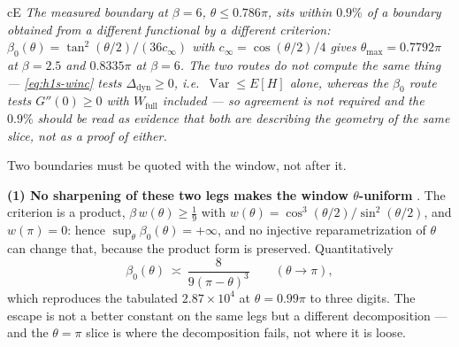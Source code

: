\begin{claimbox}{cE}
\emph{The measured boundary at $\beta=6$, $\theta\le0.786\pi$, sits within $0.9\%$ of a boundary
obtained from a different functional by a different criterion:
$\beta_{0}(\theta)=\tan^{2}(\theta/2)/(36c_{\infty})$ with $c_{\infty}=\cos(\theta/2)/4$ gives
$\theta_{\max}=0.7792\pi$ at $\beta=2.5$ and $0.8335\pi$ at $\beta=6$. The two routes do not compute
the same thing --- \eqref{eq:h1s-winc} tests $\Delta_{\mathrm{dyn}}\ge0$, i.e.\ $\operatorname{Var}\le E[H]$
alone, whereas the $\beta_{0}$ route tests $G''(0)\ge0$ with $W_{\mathrm{full}}$ included --- so
agreement is not required and the $0.9\%$ should be read as evidence that both are describing the
geometry of the same slice, not as a proof of either.} \LE{}
\end{claimbox}


Two boundaries must be quoted with the window, not after it.

\textbf{(1) No sharpening of these two legs makes the window $\theta$-uniform} \LN. The criterion is a
product, $\beta\,w(\theta)\ge\tfrac19$ with $w(\theta)=\cos^{3}(\theta/2)/\sin^{2}(\theta/2)$, and
$w(\pi)=0$: hence $\sup_{\theta}\beta_{0}(\theta)=+\infty$, and no injective reparametrization of
$\theta$ can change that, because the product form is preserved. Quantitatively
\begin{equation}
\beta_{0}(\theta)\ \asymp\ \frac{8}{9(\pi-\theta)^{3}}\qquad(\theta\to\pi),
\label{eq:h1s-div}
\end{equation}
which reproduces the tabulated $2.87\times10^{4}$ at $\theta=0.99\pi$ to three digits. The escape is
not a better constant on the same legs but a different decomposition --- and the $\theta=\pi$ slice is
where the decomposition fails, not where it is loose.

